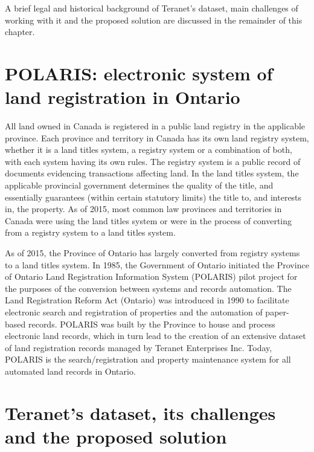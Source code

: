 A brief legal and historical background of Teranet's dataset, main challenges of working with it and the proposed solution are discussed in the remainder of this chapter.

\section{POLARIS: electronic system of land registration in Ontario} \label{sec:polaris}

All land owned in Canada is registered in a public land registry in the applicable province.
Each province and territory in Canada has its own land registry system, whether it is a land titles system, a registry system or a combination of both, with each system having its own rules.
The registry system is a public record of documents evidencing transactions affecting land.
In the land titles system, the applicable provincial government determines the quality of the title, and essentially guarantees (within certain statutory limits) the title to, and interests in, the property.
As of 2015, most common law provinces and territories in Canada were using the land titles system or were in the process of converting from a registry system to a land titles system\cite{McKean2015}.

As of 2015, the Province of Ontario has largely converted from registry systems to a land titles system.
In 1985, the Government of Ontario initiated the Province of Ontario Land Registration Information System (POLARIS) pilot project for the purposes of the conversion between systems and records automation.
The Land Registration Reform Act (Ontario)\cite{TheGovernmentofOntario1990} was introduced in 1990 to facilitate electronic search and registration of properties and the automation of paper-based records.
POLARIS was built by the Province to house and process electronic land records, which in turn lead to the creation of an extensive dataset of land registration records managed by Teranet Enterprises Inc.
Today, POLARIS is the search/registration and property maintenance system for all automated land records in Ontario.

\section{Teranet's dataset, its challenges and the proposed solution} \label{sec:teranet_challenges_solution}


